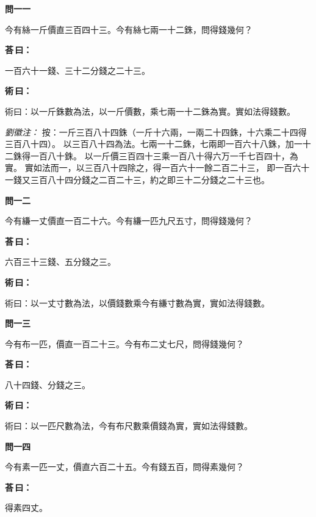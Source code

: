 \documentclass[11pt,a4paper]{article}
\newenvironment{problem}[1][]{%
  \par\vspace{0.6em}\noindent\textcolor{problemcolor}{\textbf{問\ignorespaces#1\unskip}\hspace{0.5em}}%
  \ignorespaces
}{\par\vspace{0.4em}}
\newenvironment{answer}{%
  \par\noindent\textcolor{answercolor}{\textbf{荅\,曰：}}%
  \ignorespaces
}{\par\vspace{0.3em}}
\newenvironment{method}{%
  \par\noindent\textcolor{methodcolor}{\textbf{術\,曰：}}%
  \ignorespaces
}{\par\vspace{0.4em}}
\newenvironment{liuhuicomm}{%
  \par\vspace{0.3em}\noindent\textcolor{commentarycolor}{\small\textit{劉徽注：}}}%
  {\par\vspace{0.5em}}
\begin{document}
\begin{problem}[一一]
今有絲一斤價直三百四十三。今有絲七兩一十二銖，問得錢幾何？
\end{problem}

\begin{answer}
一百六十一錢、三十二分錢之二十三。
\end{answer}

\begin{method}
術曰：以一斤銖數為法，以一斤價數，乘七兩一十二銖為實。實如法得錢數。
\end{method}

\begin{liuhuicomm}
按：一斤三百八十四銖（一斤十六兩，一兩二十四銖，十六乘二十四得三百八十四）。
以三百八十四為法。七兩一十二銖，七兩即一百六十八銖，加一十二銖得一百八十銖。
以一斤價三百四十三乘一百八十得六万一千七百四十，為實。
實如法而一，以三百八十四除之，得一百六十一餘二百二十三，
即一百六十一錢又三百八十四分錢之二百二十三，約之即三十二分錢之二十三也。
\end{liuhuicomm}

\begin{problem}[一二]
今有縑一丈價直一百二十六。今有縑一匹九尺五寸，問得錢幾何？
\end{problem}

\begin{answer}
六百三十三錢、五分錢之三。
\end{answer}

\begin{method}
術曰：以一丈寸數為法，以價錢數乘今有縑寸數為實，實如法得錢數。
\end{method}

\begin{problem}[一三]
今有布一匹，價直一百二十三。今有布二丈七尺，問得錢幾何？
\end{problem}

\begin{answer}
八十四錢、分錢之三。
\end{answer}

\begin{method}
術曰：以一匹尺數為法，今有布尺數乘價錢為實，實如法得錢數。
\end{method}

\begin{problem}[一四]
今有素一匹一丈，價直六百二十五。今有錢五百，問得素幾何？
\end{problem}

\begin{answer}
得素四丈。
\end{answer}
\end{document}
